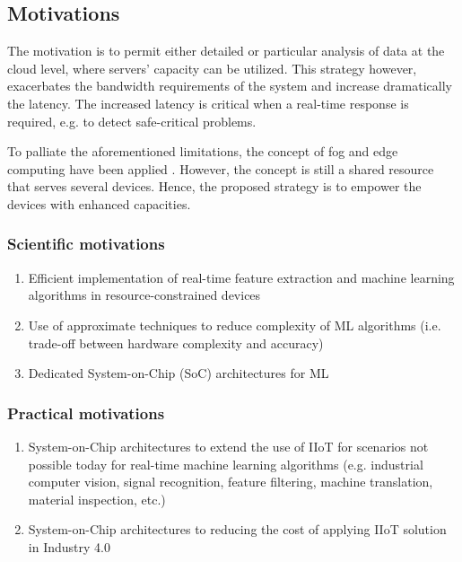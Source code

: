 \subsection{Motivations}

The motivation is to permit either detailed or particular analysis of data at the cloud level, where servers’ capacity can be utilized. This strategy however, exacerbates the bandwidth requirements of the system and increase dramatically the latency. The increased latency is critical when a real-time response is required, e.g. to detect safe-critical problems.

To palliate the aforementioned limitations, the concept of fog and edge computing have been applied \cite{lin2018cost}. However, the concept is still a shared resource that serves several devices. Hence, the proposed strategy is to empower the devices with enhanced capacities.

\subsubsection{Scientific motivations}
\begin{enumerate}
	\item Efficient implementation of real-time feature extraction and machine learning algorithms in resource-constrained devices
	\item Use of approximate techniques to reduce complexity of ML algorithms (i.e. trade-off between hardware complexity and accuracy)
	\item Dedicated System-on-Chip (SoC) architectures for ML
\end{enumerate}

\subsubsection{Practical motivations}
\begin{enumerate}
	\item System-on-Chip architectures to extend the use of IIoT for scenarios not possible today for real-time machine learning algorithms (e.g. industrial computer vision, signal recognition, feature filtering, machine translation, material inspection, etc.)
	\item System-on-Chip architectures to reducing the cost of applying IIoT solution in Industry 4.0
\end{enumerate}

\pagebreak